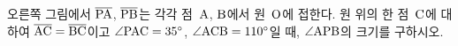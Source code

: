 \noindent\begin{minipage}[t]{0.58\linewidth}\vspace{0pt}\raggedright 오른쪽 그림에서 $\overline{\mathrm{PA}}$, $\overline{\mathrm{PB}}$는 각각 점~$\mathrm{A}$, $\mathrm{B}$에서 원~$\mathrm{O}$에 접한다. 원 위의 한 점~$\mathrm{C}$에 대하여 $\overline{\mathrm{AC}}=\overline{\mathrm{BC}}$이고 $\angle\mathrm{PAC}=35^\circ$, $\angle\mathrm{ACB}=110^\circ$일 때, $\angle\mathrm{APB}$의 크기를 구하시오.\end{minipage}\hfill\begin{minipage}[t]{0.4\linewidth}\vspace{0pt}\centering \resizebox{\ifdim\width>\linewidth\linewidth\else\width\fi}{!}{}\end{minipage}\par
